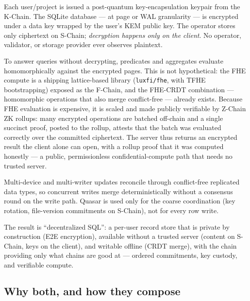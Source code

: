 \begin{description}[leftmargin=1.2em,style=nextline]
  \item[Client-held keys (K-Chain KEM).] Each user/project is issued a
  post-quantum key-encapsulation keypair from the K-Chain. The SQLite database
  --- at page or WAL granularity --- is encrypted under a data key wrapped by
  the user's KEM public key. The operator stores only ciphertext on S-Chain;
  \emph{decryption happens only on the client}. No operator, validator, or
  storage provider ever observes plaintext.
  \item[Compute on ciphertext (F-Chain FHE, Z-Chain rollups).] To answer
  queries without decrypting, predicates and aggregates evaluate homomorphically
  against the encrypted pages. This is not hypothetical: the FHE compute is a
  shipping lattice-based library (\texttt{luxfi/fhe}, with TFHE bootstrapping)
  exposed as the F-Chain, and the FHE-CRDT combination --- homomorphic operations
  that also merge conflict-free --- already exists. Because FHE evaluation is
  expensive, it is scaled and made publicly verifiable by Z-Chain ZK rollups:
  many encrypted operations are batched off-chain and a single succinct proof,
  posted to the rollup, attests that the batch was evaluated correctly over the
  committed ciphertext. The server thus returns an encrypted result the client
  alone can open, with a rollup proof that it was computed honestly --- a public,
  permissionless confidential-compute path that needs no trusted server.
  \item[Coordinator-free merge (CRDTs).] Multi-device and multi-writer updates
  reconcile through conflict-free replicated data types, so concurrent writes
  merge deterministically without a consensus round on the write path. Quasar is
  used only for the coarse coordination (key rotation, file-version commitments
  on S-Chain), not for every row write.
\end{description}

The result is ``decentralized SQL'': a per-user record store that is private by
construction (E2E encryption), available without a trusted server (content on
S-Chain, keys on the client), and writable offline (CRDT merge), with the chain
providing only what chains are good at --- ordered commitments, key custody, and
verifiable compute.

\subsection{Why both, and how they compose}

